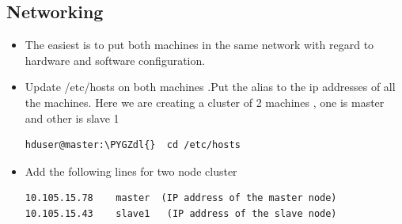 \documentclass[letterpaper,10pt,english]{sphinxmanual}
\def\PYGZdl{\char`\$}
\begin{document}
\subsection{Networking}
\label{hadoop:networking}\begin{itemize}
\item {} 
The easiest is to put both machines in the same network with regard to hardware and   software configuration.

\item {} 
Update /etc/hosts on both machines .Put the alias to the ip addresses of all the machines. Here we are creating a cluster of 2 machines , one is master and other is slave 1

\begin{Verbatim}[commandchars=\\\{\}]
hduser@master:\PYGZdl{}  cd /etc/hosts
\end{Verbatim}

\item {} 
Add the following lines for two node cluster

\begin{Verbatim}[commandchars=\\\{\}]
10.105.15.78    master  (IP address of the master node)
10.105.15.43    slave1   (IP address of the slave node)
\end{Verbatim}

\end{itemize}
\begin{figure}[htbp]
\centering

\end{figure}
\end{document}

